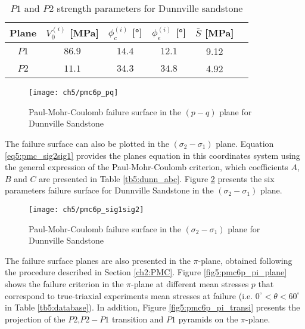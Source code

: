 \begin{table} [p]
    \centering 
    \begin{tabular}{cccccc}
        \hline 
        Plane & $V_0^{(i)}$ [\si{MPa}] & $\phi_c^{(i)}$ [\si{\degree}] & $\phi_e^{(i)}$ [\si{\degree}] & $\bar{S}$ [\si{MPa}]\\
        \hline
        \hline
        $P1$ & $86.9$ & $14.4$ & $12.1$ & 9.12\\
        $P2$ & $11.1$ & $34.3$ & $34.8$ & 4.92\\
        \hline
    \end{tabular}
    \captionsetup{justification=centering}
    \caption{$P1$ and $P2$ strength parameters for Dunnville sandstone}
    \label{tb5:dunn_summary}
\end{table}

\begin{figure} [p]
    \centering
    \texttt{[image: ch5/pmc6p\_pq]}
    \caption{Paul-Mohr-Coulomb failure surface in the $(p-q)$ plane for Dunnville Sandstone}
    \label{fig5:pmc6p_pq}
\end{figure}

The failure surface can also be plotted in the $(\sigma_2-\sigma_1)$ plane. Equation \ref{eq5:pmc_sig2sig1} provides the planes equation in this coordinates system using the general expression of the Paul-Mohr-Coulomb criterion, which coefficients $A$, $B$ and $C$ are presented in Table \ref{tb5:dunn_abc}. Figure \ref{fig5:pmc6p_sig1sig2} presents the six parameters failure surface for Dunnville Sandstone in the  $(\sigma_2-\sigma_1)$ plane.

\begin{figure} [p]
    \centering
    \texttt{[image: ch5/pmc6p\_sig1sig2]}
    \caption{Paul-Mohr-Coulomb failure surface in the $(\sigma_2-\sigma_1)$ plane for Dunnville Sandstone}
    \label{fig5:pmc6p_sig1sig2}
\end{figure}

The failure surface planes are also presented in the $\pi$-plane, obtained following the procedure described in Section \ref{ch2:PMC}. Figure \ref{fig5:pmc6p_pi_plane} shows the failure criterion in the $\pi$-plane at different mean stresses $p$ that correspond to true-triaxial experiments mean stresses at failure (i.e. $0^\circ < \theta < 60^\circ$ in Table \ref{tb5:database}). In addition, Figure \ref{fig5:pmc6p_pi_transi} presents the projection of the $P2$,$P2-P1$ transition and $P1$ pyramids on the $\pi$-plane. 

